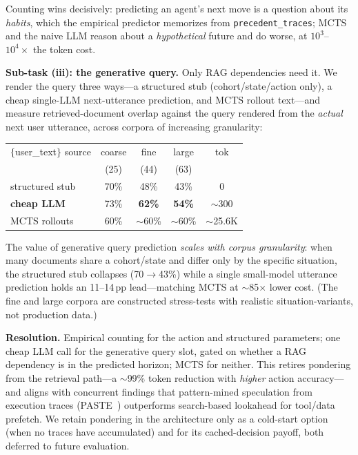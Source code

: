 \documentclass[10pt,twocolumn]{article}
\begin{document}
\noindent Counting wins decisively: predicting an agent's next move is a question about its \emph{habits}, which the empirical predictor memorizes from \texttt{precedent\_traces}; MCTS and the naive LLM reason about a \emph{hypothetical} future and do worse, at $10^3$--$10^4\times$ the token cost.

\textbf{Sub-task (iii): the generative query.} Only RAG dependencies need it. We render the query three ways---a structured stub (cohort/state/action only), a cheap single-LLM next-utterance prediction, and MCTS rollout text---and measure retrieved-document overlap against the query rendered from the \emph{actual} next user utterance, across corpora of increasing granularity:

\begin{center}\footnotesize\setlength{\tabcolsep}{5pt}
\begin{tabular}{lcccc}
\toprule
$\{$user\_text$\}$ source & coarse & fine & large & tok \\
& (25) & (44) & (63) & \\
\midrule
structured stub & 70\% & 48\% & 43\% & 0 \\
\textbf{cheap LLM} & 73\% & \textbf{62\%} & \textbf{54\%} & $\sim$300 \\
MCTS rollouts & 60\% & $\sim$60\% & $\sim$60\% & $\sim$25.6K \\
\bottomrule
\end{tabular}
\end{center}

\noindent The value of generative query prediction \emph{scales with corpus granularity}: when many documents share a cohort/state and differ only by the specific situation, the structured stub collapses (70$\to$43\%) while a single small-model utterance prediction holds an 11--14\,pp lead---matching MCTS at $\sim$85$\times$ lower cost. (The fine and large corpora are constructed stress-tests with realistic situation-variants, not production data.)

\textbf{Resolution.} Empirical counting for the action and structured parameters; one cheap LLM call for the generative query slot, gated on whether a RAG dependency is in the predicted horizon; MCTS for neither. This retires pondering from the retrieval path---a $\sim$99\% token reduction with \emph{higher} action accuracy---and aligns with concurrent findings that pattern-mined speculation from execution traces (PASTE~\cite{paste2026}) outperforms search-based lookahead for tool/data prefetch. We retain pondering in the architecture only as a cold-start option (when no traces have accumulated) and for its cached-decision payoff, both deferred to future evaluation.
\end{document}
